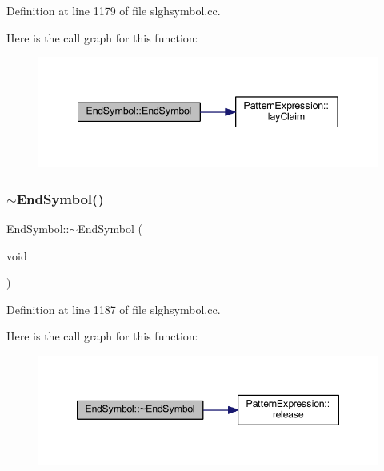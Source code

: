 Definition at line 1179 of file slghsymbol.\+cc.

Here is the call graph for this function\+:
\nopagebreak
\begin{figure}[H]
\begin{center}
\leavevmode
\includegraphics[width=342pt]{class_end_symbol_a796ceddba9cf357f920b8e3bca6b14ab_cgraph}
\end{center}
\end{figure}
\mbox{\label{class_end_symbol_a832ebd0b18ed3942f1af64eb75336a9e}} 
\subsubsection{\texorpdfstring{$\sim$EndSymbol()}{~EndSymbol()}}
{\footnotesize\ttfamily End\+Symbol\+::$\sim$\+End\+Symbol (\begin{DoxyParamCaption}\item[{void}]{ }\end{DoxyParamCaption})\hspace{0.3cm}{\ttfamily [virtual]}}



Definition at line 1187 of file slghsymbol.\+cc.

Here is the call graph for this function\+:
\nopagebreak
\begin{figure}[H]
\begin{center}
\leavevmode
\includegraphics[width=348pt]{class_end_symbol_a832ebd0b18ed3942f1af64eb75336a9e_cgraph}
\end{center}
\end{figure}


